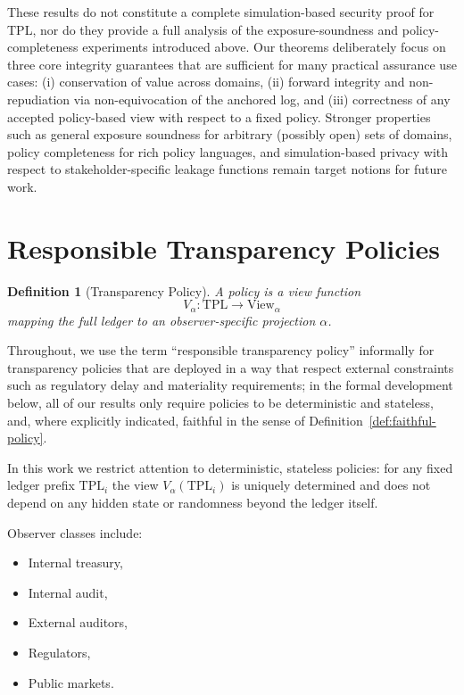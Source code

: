 \documentclass[11pt]{article}
\newtheorem{definition}{Definition}
\begin{document}
These results do not constitute a complete simulation-based security proof for
TPL, nor do they provide a full analysis of the exposure-soundness and policy-completeness experiments introduced above.
Our theorems deliberately focus on three core integrity guarantees that are sufficient for many practical assurance use cases:
(i) conservation of value across domains, (ii) forward integrity and non-repudiation via non-equivocation of the anchored log,
and (iii) correctness of any accepted policy-based view with respect to a fixed policy.
Stronger properties such as general exposure soundness for arbitrary (possibly open) sets of domains, policy completeness for rich
policy languages, and simulation-based privacy with respect to stakeholder-specific leakage functions remain target notions for
future work.
\section{Responsible Transparency Policies}
\label{sec:responsible}

\begin{definition}[Transparency Policy]
A policy is a view function
\[
V_\alpha: \mathrm{TPL} \to \mathrm{View}_\alpha
\]
mapping the full ledger to an observer-specific projection $\alpha$.

\end{definition}

Throughout, we use the term ``responsible transparency policy'' informally for transparency policies
that are deployed in a way that respect external constraints such as regulatory delay and materiality
requirements; in the formal development below, all of our results only require policies to be deterministic
and stateless, and, where explicitly indicated, faithful in the sense of Definition~\ref{def:faithful-policy}.

In this work we restrict attention to deterministic, stateless policies: for any fixed ledger prefix $\mathrm{TPL}_i$ the view $V_\alpha(\mathrm{TPL}_i)$ is uniquely determined and does not depend on any hidden state or randomness beyond the ledger itself.

Observer classes include:

\begin{itemize}[noitemsep]
\item Internal treasury,
\item Internal audit,
\item External auditors,
\item Regulators,
\item Public markets.
\end{itemize}
\end{document}
